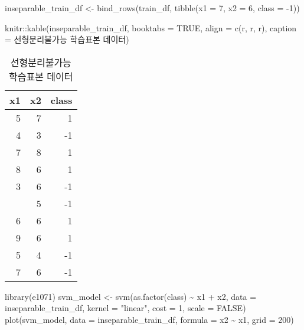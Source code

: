 \documentclass[
]{book}
\newenvironment{Shaded}{\begin{snugshade}}{\end{snugshade}}
\newcommand{\AttributeTok}[1]{\textcolor[rgb]{0.77,0.63,0.00}{#1}}
\newcommand{\ConstantTok}[1]{\textcolor[rgb]{0.00,0.00,0.00}{#1}}
\newcommand{\DecValTok}[1]{\textcolor[rgb]{0.00,0.00,0.81}{#1}}
\newcommand{\FunctionTok}[1]{\textcolor[rgb]{0.00,0.00,0.00}{#1}}
\newcommand{\NormalTok}[1]{#1}
\newcommand{\OtherTok}[1]{\textcolor[rgb]{0.56,0.35,0.01}{#1}}
\newcommand{\SpecialCharTok}[1]{\textcolor[rgb]{0.00,0.00,0.00}{#1}}
\newcommand{\StringTok}[1]{\textcolor[rgb]{0.31,0.60,0.02}{#1}}
\begin{document}
\begin{Shaded}
\begin{Highlighting}[]
\NormalTok{inseparable\_train\_df }\OtherTok{\textless{}{-}} \FunctionTok{bind\_rows}\NormalTok{(train\_df, }
                                  \FunctionTok{tibble}\NormalTok{(}\AttributeTok{x1 =} \DecValTok{7}\NormalTok{, }\AttributeTok{x2 =} \DecValTok{6}\NormalTok{, }\AttributeTok{class =} \SpecialCharTok{{-}}\DecValTok{1}\NormalTok{))}

\NormalTok{knitr}\SpecialCharTok{::}\FunctionTok{kable}\NormalTok{(inseparable\_train\_df, }\AttributeTok{booktabs =} \ConstantTok{TRUE}\NormalTok{,}
             \AttributeTok{align =} \FunctionTok{c}\NormalTok{(}\StringTok{\textquotesingle{}r\textquotesingle{}}\NormalTok{, }\StringTok{\textquotesingle{}r\textquotesingle{}}\NormalTok{, }\StringTok{\textquotesingle{}r\textquotesingle{}}\NormalTok{),}
             \AttributeTok{caption =} \StringTok{\textquotesingle{}선형분리불가능 학습표본 데이터\textquotesingle{}}\NormalTok{)}
\end{Highlighting}
\end{Shaded}

\begin{table}

\caption{\label{tab:svm-inseparable-train-data-table}선형분리불가능 학습표본 데이터}
\centering
\begin{tabular}[t]{rrr}
\toprule
x1 & x2 & class\\
\midrule
5 & 7 & 1\\
4 & 3 & -1\\
7 & 8 & 1\\
8 & 6 & 1\\
3 & 6 & -1\\
\addlinespace
2 & 5 & -1\\
6 & 6 & 1\\
9 & 6 & 1\\
5 & 4 & -1\\
7 & 6 & -1\\
\bottomrule
\end{tabular}
\end{table}

\begin{Shaded}
\begin{Highlighting}[]
\FunctionTok{library}\NormalTok{(e1071)}
\NormalTok{svm\_model }\OtherTok{\textless{}{-}} \FunctionTok{svm}\NormalTok{(}\FunctionTok{as.factor}\NormalTok{(class) }\SpecialCharTok{\textasciitilde{}}\NormalTok{ x1 }\SpecialCharTok{+}\NormalTok{ x2, }\AttributeTok{data =}\NormalTok{ inseparable\_train\_df, }
                 \AttributeTok{kernel =} \StringTok{"linear"}\NormalTok{, }\AttributeTok{cost =} \DecValTok{1}\NormalTok{, }\AttributeTok{scale =} \ConstantTok{FALSE}\NormalTok{)}
\FunctionTok{plot}\NormalTok{(svm\_model, }\AttributeTok{data =}\NormalTok{ inseparable\_train\_df, }\AttributeTok{formula =}\NormalTok{ x2 }\SpecialCharTok{\textasciitilde{}}\NormalTok{ x1, }\AttributeTok{grid =} \DecValTok{200}\NormalTok{)}
\end{Highlighting}
\end{Shaded}
\end{document}

